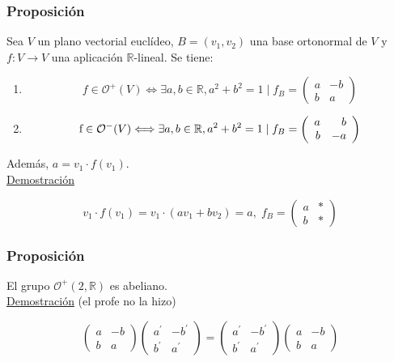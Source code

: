 \documentclass[12pt, a4paper, ones, notitlepage, openany,titlepage]{article}
\begin{document}
\subsubsection{Proposición}
Sea $V$ un plano vectorial euclídeo, $B=\left(v_{1}, v_{2}\right)$ una base ortonormal de $V$ y $f: V \rightarrow V$ una aplicación $\mathbb{R}$-lineal. Se tiene:
\begin{enumerate}[label=(\arabic*)]
	\item $$ 
	f \in \mathcal{O}^{+}(V) \Longleftrightarrow \exists a, b \in \mathbb{R}, a^{2}+b^{2}=1 \mid f_{B}=\left(\begin{array}{rr}
		a & -b \\
		b & a
	\end{array}\right)
	$$
	\item $$
	\text f \in \mathcal{O}^{-}(V) \Longleftrightarrow \exists a, b \in \mathbb{R}, a^{2}+b^{2}=1 \mid f_{B}=\left(\begin{array}{rr}
		a & b \\
		b & -a
	\end{array}\right)
	$$
\end{enumerate}

\noindent Además, $a=v_{1} \cdot f\left(v_{1}\right)$.\\

\noindent\underline{Demostración} 

$$
v_1 \cdot f(v_1) = v_1 \cdot (av_1 + bv_2) = a, \; f_B =
\begin{pmatrix}
	a & * \\
	b & *
\end{pmatrix}
$$

\subsubsection{Proposición}
El grupo $\mathcal{O}^{+}(2, \mathbb{R})$ es abeliano.\\

\noindent\underline{Demostración} (el profe no la hizo)

$$
\left(\begin{array}{rr}
	a & -b \\
	b & a
\end{array}\right)\left(\begin{array}{rr}
	a^{\prime} & -b^{\prime} \\
	b^{\prime} & a^{\prime}
\end{array}\right)=\left(\begin{array}{rr}
	a^{\prime} & -b^{\prime} \\
	b^{\prime} & a^{\prime}
\end{array}\right)\left(\begin{array}{rr}
	a & -b \\
	b & a
\end{array}\right)
$$
\end{document}
